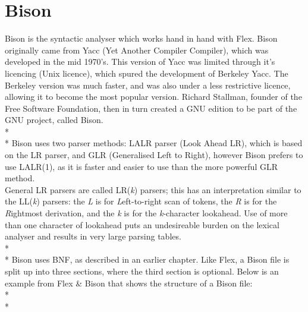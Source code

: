 \documentclass[12pt]{report}
\begin{document}
\section{Bison}\label{sec:bison}
Bison is the syntactic analyser which works hand in hand with Flex.  Bison originally came from Yacc (Yet Another Compiler Compiler), which was developed in the mid 1970's.  This version of Yacc was limited through it's licencing (Unix licence), which spured the development of Berkeley Yacc.  The Berkeley version was much faster, and was also under a less restrictive licence, allowing it to become the most popular version.  Richard Stallman, founder of the Free Software Foundation, then in turn created a GNU edition to be part of the GNU project, called Bison.\\*
\\*
Bison uses two parser methods: LALR parser (Look Ahead LR), which is based on the LR parser, and GLR (Generalised Left to Right), however Bison prefers to use LALR(1), as it is faster and easier to use than the more powerful GLR method.
\\
General LR parsers are called LR(\textit{k}) parsers; this has an interpretation similar to the LL(\textit{k}) parsers: the \textit{L} is for \textit{L}eft-to-right scan of tokens, the \textit{R} is for the \textit{R}ightmost derivation, and the \textit{k} is for the \textit{k}-character lookahead.  Use of more than one character of lookahead puts an undesireable burden on the lexical analyser and results in very large parsing tables. \citep{compilerconstruction92}
\\*
\\*
Bison uses BNF, as described in an earlier chapter.  Like Flex, a Bison file is split up into three sections, where the third section is optional.  Below is an example from Flex \& Bison that shows the structure of a Bison file:\\*
\\*
\end{document}
